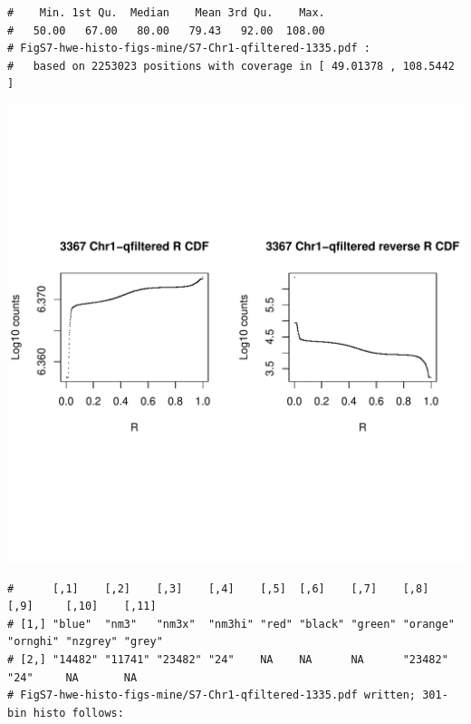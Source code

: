 \documentclass{article}\usepackage[]{graphicx}\usepackage[]{color}
\makeatletter
\def\maxwidth{ %
  \ifdim\Gin@nat@width>\linewidth
    \linewidth
  \else
    \Gin@nat@width
  \fi
}
\newenvironment{kframe}{%
 \def\at@end@of@kframe{}%
 \ifinner\ifhmode%
  \def\at@end@of@kframe{\end{minipage}}%
  \begin{minipage}{\columnwidth}%
 \fi\fi%
 \def\FrameCommand##1{\hskip\@totalleftmargin \hskip-\fboxsep
 \colorbox{shadecolor}{##1}\hskip-\fboxsep
     \hskip-\linewidth \hskip-\@totalleftmargin \hskip\columnwidth}%
 \MakeFramed {\advance\hsize-\width
   \@totalleftmargin\z@ \linewidth\hsize
   \@setminipage}}%
 {\par\unskip\endMakeFramed%
 \at@end@of@kframe}
\newenvironment{knitrout}{}{} %
\makeatother
\begin{document}
\begin{knitrout}
\begin{kframe}
\begin{verbatim}
#    Min. 1st Qu.  Median    Mean 3rd Qu.    Max. 
#   50.00   67.00   80.00   79.43   92.00  108.00 
# FigS7-hwe-histo-figs-mine/S7-Chr1-qfiltered-1335.pdf :
#   based on 2253023 positions with coverage in [ 49.01378 , 108.5442 ]
\end{verbatim}
\end{kframe}
\includegraphics[width=\maxwidth]{FigS7-hwe-histo-figs-knitr/unnamed-chunk-10-54} 
\begin{kframe}\begin{verbatim}
#      [,1]    [,2]    [,3]    [,4]    [,5]  [,6]    [,7]    [,8]     [,9]     [,10]    [,11] 
# [1,] "blue"  "nm3"   "nm3x"  "nm3hi" "red" "black" "green" "orange" "ornghi" "nzgrey" "grey"
# [2,] "14482" "11741" "23482" "24"    NA    NA      NA      "23482"  "24"     NA       NA    
# FigS7-hwe-histo-figs-mine/S7-Chr1-qfiltered-1335.pdf written; 301-bin histo follows:
\end{verbatim}
\end{kframe}

\end{knitrout}
\end{document}
